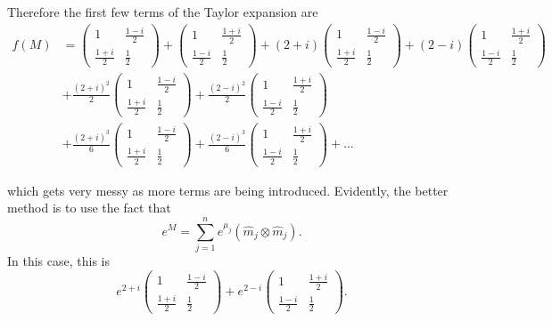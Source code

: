 \documentclass[a4paper, 12pt,oneside,openany]{book}
\begin{document}
{	Therefore the first few terms of the Taylor expansion are \begin{align*} f(M) &= \begin{pmatrix} 1 & \frac{1-i}{2} \\ \frac{1+i}{2} & \frac{1}{2} \end{pmatrix} +\begin{pmatrix} 1 & \frac{1+i}{2} \\ \frac{1-i}{2} & \frac{1}{2} \end{pmatrix} + (2+i) \begin{pmatrix} 1 & \frac{1-i}{2} \\ \frac{1+i}{2} & \frac{1}{2} \end{pmatrix} + (2-i) \begin{pmatrix} 1 & \frac{1+i}{2} \\ \frac{1-i}{2} & \frac{1}{2} \end{pmatrix} \\ &+ \frac{(2+i)^2}{2}  \begin{pmatrix} 1 & \frac{1-i}{2} \\ \frac{1+i}{2} & \frac{1}{2} \end{pmatrix} + \frac{(2-i)^2}{2}  \begin{pmatrix} 1 & \frac{1+i}{2} \\ \frac{1-i}{2} & \frac{1}{2} \end{pmatrix}\\ &+ \frac{(2+i)^3}{6} \begin{pmatrix} 1 & \frac{1-i}{2} \\ \frac{1+i}{2} & \frac{1}{2} \end{pmatrix}+ \frac{(2-i)^3}{6} \begin{pmatrix} 1 & \frac{1+i}{2} \\ \frac{1-i}{2} & \frac{1}{2} \end{pmatrix} +\dots \end{align*}
	
	which gets very messy as more terms are being introduced. Evidently, the better method is to use the fact that $$e^{M} = \sum\limits_{j=1}^n  e^{\mu_j} (\hat{m}_j \otimes \hat{m}_j).$$ In this case, this is $$e^{2+i}\begin{pmatrix} 1 & \frac{1-i}{2} \\ \frac{1+i}{2} & \frac{1}{2} \end{pmatrix} + e^{2-i}\begin{pmatrix} 1 & \frac{1+i}{2} \\ \frac{1-i}{2} & \frac{1}{2} \end{pmatrix} .$$
}
\end{document}
